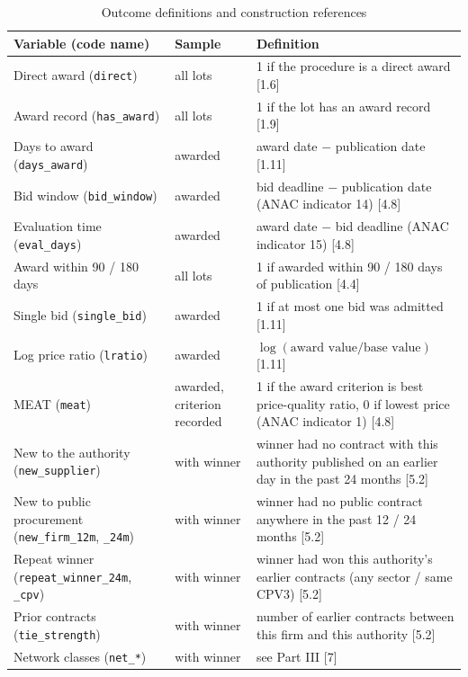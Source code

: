 \documentclass[11pt,a4paper]{article}
\newcommand{\code}[1]{\texttt{\small #1}}
\newcommand{\sect}[1]{\textsf{\small [#1]}}
\begin{document}
\begin{table}[H]
\centering\small
\caption{Outcome definitions and construction references}
\label{tab:vars}
\begin{tabularx}{\textwidth}{>{\raggedright}p{3.3cm}>{\raggedright}p{2.2cm}X}
\toprule
Variable (code name) & Sample & Definition \\
\midrule
Direct award (\code{direct}) & all lots & 1 if the procedure is a direct award \sect{1.6} \\
Award record (\code{has\_award}) & all lots & 1 if the lot has an award record \sect{1.9} \\
Days to award (\code{days\_award}) & awarded & award date $-$ publication date \sect{1.11} \\
Bid window (\code{bid\_window}) & awarded & bid deadline $-$ publication date (ANAC indicator 14) \sect{4.8} \\
Evaluation time (\code{eval\_days}) & awarded & award date $-$ bid deadline (ANAC indicator 15) \sect{4.8} \\
Award within 90 / 180 days & all lots & 1 if awarded within 90 / 180 days of publication \sect{4.4} \\
Single bid (\code{single\_bid}) & awarded & 1 if at most one bid was admitted \sect{1.11} \\
Log price ratio (\code{lratio}) & awarded & $\log(\text{award value}/\text{base value})$ \sect{1.11} \\
MEAT (\code{meat}) & awarded, criterion recorded & 1 if the award criterion is best price-quality ratio, 0 if lowest price (ANAC indicator 1) \sect{4.8} \\
New to the authority (\code{new\_supplier}) & with winner & winner had no contract with this authority published on an earlier day in the past 24 months \sect{5.2} \\
New to public procurement (\code{new\_firm\_12m}, \code{\_24m}) & with winner & winner had no public contract anywhere in the past 12 / 24 months \sect{5.2} \\
Repeat winner (\code{repeat\_winner\_24m}, \code{\_cpv}) & with winner & winner had won this authority's earlier contracts (any sector / same CPV3) \sect{5.2} \\
Prior contracts (\code{tie\_strength}) & with winner & number of earlier contracts between this firm and this authority \sect{5.2} \\
Network classes (\code{net\_*}) & with winner & see Part III \sect{7} \\
\bottomrule
\end{tabularx}
\end{table}
\end{document}
